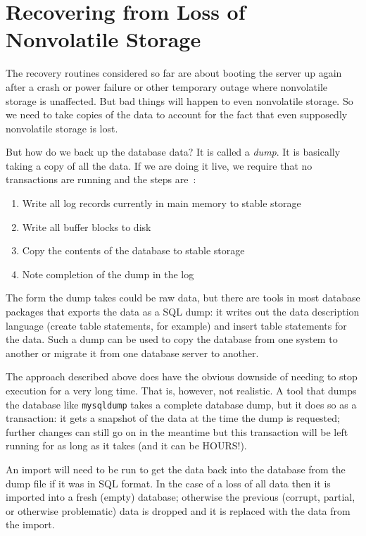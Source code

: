 \documentclass[a4paper]{report}
\begin{document}
\section*{Recovering from Loss of Nonvolatile Storage}

The recovery routines considered so far are about booting the server up again after a crash or power failure or other temporary outage where nonvolatile storage is unaffected. But bad things will happen to even nonvolatile storage. So we need to take copies of the data to account for the fact that even supposedly nonvolatile storage is lost.

But how do we back up the database data? It is called a \textit{dump}. It is basically taking a copy of all the data. If we are doing it live, we require that no transactions are running and the steps are~\cite{dsc}:

\begin{enumerate}
	\item Write all log records currently in main memory to stable storage
	\item Write all buffer blocks to disk
	\item Copy the contents of the database to stable storage
	\item Note completion of the dump in the log
\end{enumerate}

The form the dump takes could be raw data, but there are tools in most database packages that exports the data as a SQL dump: it writes out the data description language (create table statements, for example) and insert table statements for the data. Such a dump can be used to copy the database from one system to another or migrate it from one database server to another.

The approach described above does have the obvious downside of needing to stop execution for a very long time. That is, however, not realistic. A tool that dumps the database like \texttt{mysqldump} takes a complete database dump, but it does so as a transaction: it gets a snapshot of the data at the time the dump is requested; further changes can still go on in the meantime but this transaction will be left running for as long as it takes (and it can be HOURS!).

An import will need to be run to get the data back into the database from the dump file if it was in SQL format. In the case of a loss of all data then it is imported into a fresh (empty) database; otherwise the previous (corrupt, partial, or otherwise problematic) data is dropped and it is replaced with the data from the import.
\end{document}
